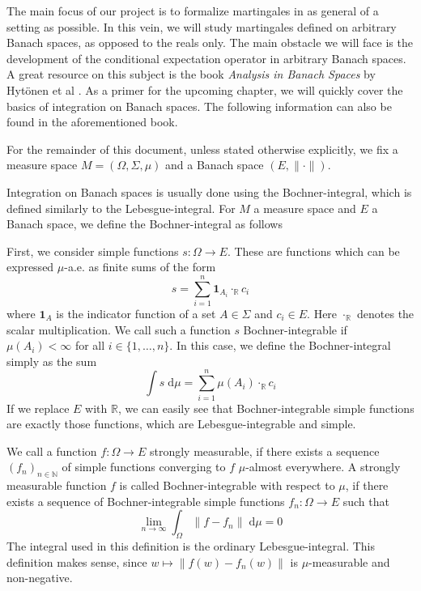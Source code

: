 The main focus of our project is to formalize martingales in as general of a setting as possible. In this vein, we will study martingales defined on arbitrary Banach spaces, as opposed to the reals only. The main obstacle we will face is the development of the conditional expectation operator in arbitrary Banach spaces. A great resource on this subject is the book \textit{Analysis in Banach Spaces} by Hytönen et al \cite{Hytoenen_2016}. As a primer for the upcoming chapter, we will quickly cover the basics of integration on Banach spaces. The following information can also be found in the aforementioned book.

\begin{remark}
	For the remainder of this document, unless stated otherwise explicitly, we fix a measure space $M = (\Omega, \Sigma, \mu)$ and a Banach space $(E, \lVert \cdot \rVert)$.
\end{remark}

Integration on Banach spaces is usually done using the Bochner-integral, which is defined similarly to the Lebesgue-integral. For $M$ a measure space and $E$ a Banach space, we define the Bochner-integral as follows

\relax
{}\relax
\vspace{0.3cm}

First, we consider simple functions $s : \Omega \rightarrow E$. These are functions which can be expressed $\mu$-a.e. as finite sums of the form
\[
	s = \sum_{i=1}^n \mathbf{1}_{A_i} \cdot_\mathbb{R} c_i
\]
where $\mathbf{1}_A$ is the indicator function of a set $A \in \Sigma$ and $c_i \in E$. Here $\cdot_\mathbb{R}$ denotes the scalar multiplication. We call such a function $s$ Bochner-integrable if $\mu(A_i) < \infty$ for all $i \in \{1,\dots,n\}$. In this case, we define the Bochner-integral simply as the sum
\[
	\int s \; \textrm{d}\mu = \sum_{i=1}^n \mu(A_i) \cdot_\mathbb{R} c_i
\]
If we replace $E$ with $\mathbb{R}$, we can easily see that Bochner-integrable simple functions are exactly those functions, which are Lebesgue-integrable and simple.
\vspace{0.2cm}

We call a function $f : \Omega \rightarrow E$ strongly measurable, if there exists a sequence $(f_n)_{n\in\mathbb{N}}$ of simple functions converging to $f$ $\mu$-almost everywhere.
A strongly measurable function $f$ is called Bochner-integrable with respect to $\mu$, if there exists a sequence of Bochner-integrable simple functions $f_n : \Omega \rightarrow E$ such that
\[
	\lim_{n \to \infty} \int_\Omega \lVert f - f_n \rVert \; \textrm{d}\mu = 0
\]
The integral used in this definition is the ordinary Lebesgue-integral. This definition makes sense, since $w \mapsto \lVert f(w) - f_n(w) \rVert$ is $\mu$-measurable and non-negative.

